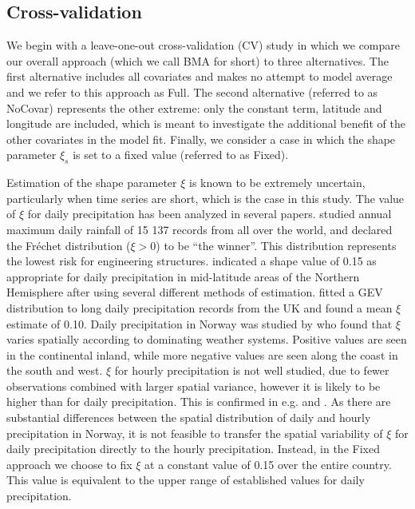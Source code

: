 \documentclass[11pt,english]{article}
\begin{document}
\subsection{Cross-validation}\label{sec:cv}
\indent We begin with a leave-one-out cross-validation (CV) study in which we compare our overall approach (which we call BMA for short) to three alternatives.  The first alternative includes all covariates and makes no attempt to model average and we refer to this approach as Full.  The second alternative (referred to as NoCovar) represents the other extreme: only the constant term, latitude and longitude are included, which is meant to investigate the additional benefit of the other covariates in the model fit.  Finally, we consider a case in which the shape parameter $\xi_s$ is set to a fixed value (referred to as Fixed).  

Estimation of the shape parameter $\xi$ is known to be extremely uncertain, particularly when time series are short, which is the case in this study. The value of $\xi$ for daily precipitation has been analyzed in several papers. \cite{PapalexiouandKoutsoyiannis2013} studied annual maximum daily rainfall of 15 137 records from all over the world, and declared the Fr\'echet distribution ($\xi>0$) to be ``the winner''. This distribution represents the lowest risk for engineering structures. \cite{Koutsoyiannis2004b} indicated a shape value of 0.15 as appropriate for daily precipitation in mid-latitude areas of the Northern Hemisphere after using several different methods of estimation. \cite{WilsonandToumi2005} fitted a GEV distribution to long daily precipitation records from the UK and found a mean $\xi$ estimate of 0.10. Daily precipitation in Norway was studied by \cite{Dyrrdaletal2014} who found that $\xi$ varies spatially according to dominating weather systems. Positive values are seen in the continental inland, while more negative values are seen along the coast in the south and west. $\xi$ for hourly precipitation is not well studied, due to fewer observations combined with larger spatial variance, however it is likely to be higher than for daily precipitation. This is confirmed in e.g. \cite{Overeemetal2010} and \cite{VandeVyver2012}. As there are substantial differences between the spatial distribution of daily and hourly precipitation in Norway, it is not feasible to transfer the spatial variability of $\xi$ for daily precipitation directly to the hourly precipitation. Instead, in the Fixed approach we choose to fix $\xi$ at a constant value of 0.15 over the entire country. This value is equivalent to the upper range of established values for daily precipitation.
\end{document}
